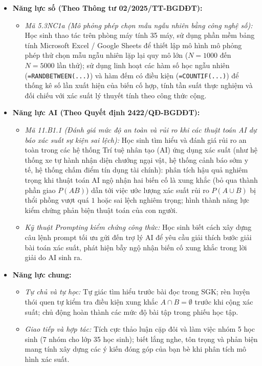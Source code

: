 \documentclass[12pt, a4paper]{article}
\begin{document}
\begin{itemize}[leftmargin=1.2cm]
    \item \textbf{Năng lực số (Theo Thông tư 02/2025/TT-BGDĐT):}
    \begin{itemize}[leftmargin=0.6cm]
        \item \textit{Mã 5.3NC1a (Mô phỏng phép chọn mẫu ngẫu nhiên bằng công nghệ số):} Học sinh thao tác trên phòng máy tính 35 máy, sử dụng phần mềm bảng tính Microsoft Excel / Google Sheets để thiết lập mô hình mô phỏng phép thử chọn mẫu ngẫu nhiên lặp lại quy mô lớn ($N = 1000$ đến $N = 5000$ lần thử); sử dụng linh hoạt các hàm số học ngẫu nhiên (\texttt{=RANDBETWEEN(...)}) và hàm đếm có điều kiện (\texttt{=COUNTIF(...)}) để thống kê số lần xuất hiện của biến cố hợp, tính tần suất thực nghiệm và đối chiếu với xác suất lý thuyết tính theo công thức cộng.
    \end{itemize}

    \item \textbf{Năng lực AI (Theo Quyết định 2422/QĐ-BGDĐT):}
    \begin{itemize}[leftmargin=0.6cm]
        \item \textit{Mã 11.B1.1 (Đánh giá mức độ an toàn và rủi ro khi các thuật toán AI dự báo xác suất sự kiện sai lệch):} Học sinh tìm hiểu và đánh giá rủi ro an toàn trong các hệ thống Trí tuệ nhân tạo (AI) ứng dụng xác suất (như hệ thống xe tự hành nhận diện chướng ngại vật, hệ thống cảnh báo sớm y tế, hệ thống chấm điểm tín dụng tài chính): phân tích hậu quả nghiêm trọng khi thuật toán AI ngộ nhận hai biến cố là xung khắc (bỏ qua thành phần giao $P(AB)$) dẫn tới việc ước lượng xác suất rủi ro $P(A \cup B)$ bị thổi phồng vượt quá $1$ hoặc sai lệch nghiêm trọng; hình thành năng lực kiểm chứng phản biện thuật toán của con người.
        \item \textit{Kỹ thuật Prompting kiểm chứng công thức:} Học sinh biết cách xây dựng câu lệnh prompt tối ưu gửi đến trợ lý AI để yêu cầu giải thích bước giải bài toán xác suất, phát hiện bẫy ngộ nhận biến cố xung khắc trong lời giải do AI sinh ra.
    \end{itemize}

    \item \textbf{Năng lực chung:}
    \begin{itemize}[leftmargin=0.6cm]
        \item \textit{Tự chủ và tự học:} Tự giác tìm hiểu trước bài đọc trong SGK; rèn luyện thói quen tự kiểm tra điều kiện xung khắc $A \cap B = \emptyset$ trước khi cộng xác suất; chủ động hoàn thành các mức độ bài tập trong phiếu học tập.
        \item \textit{Giao tiếp và hợp tác:} Tích cực thảo luận cặp đôi và làm việc nhóm 5 học sinh (7 nhóm cho lớp 35 học sinh); biết lắng nghe, tôn trọng và phản biện mang tính xây dựng các ý kiến đóng góp của bạn bè khi phân tích mô hình xác suất.
    \end{itemize}
\end{itemize}
\end{document}
